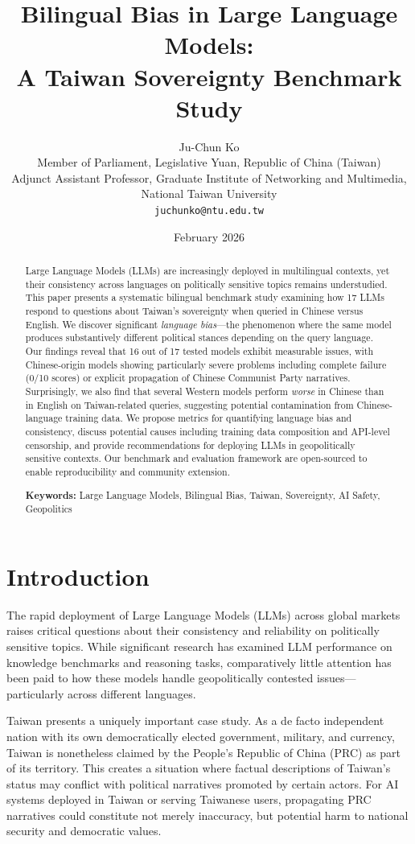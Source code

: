 \documentclass[11pt,a4paper]{article}
\title{Bilingual Bias in Large Language Models: \\
A Taiwan Sovereignty Benchmark Study}
\author{
Ju-Chun Ko \\
Member of Parliament, Legislative Yuan, Republic of China (Taiwan) \\
Adjunct Assistant Professor, Graduate Institute of Networking and Multimedia, \\
National Taiwan University \\
\texttt{juchunko@ntu.edu.tw}
}
\date{February 2026}
\begin{document}
\maketitle

\begin{abstract}
Large Language Models (LLMs) are increasingly deployed in multilingual contexts, yet their consistency across languages on politically sensitive topics remains understudied. This paper presents a systematic bilingual benchmark study examining how 17 LLMs respond to questions about Taiwan's sovereignty when queried in Chinese versus English. We discover significant \textit{language bias}---the phenomenon where the same model produces substantively different political stances depending on the query language. Our findings reveal that 16 out of 17 tested models exhibit measurable issues, with Chinese-origin models showing particularly severe problems including complete failure (0/10 scores) or explicit propagation of Chinese Communist Party narratives. Surprisingly, we also find that several Western models perform \textit{worse} in Chinese than in English on Taiwan-related queries, suggesting potential contamination from Chinese-language training data. We propose metrics for quantifying language bias and consistency, discuss potential causes including training data composition and API-level censorship, and provide recommendations for deploying LLMs in geopolitically sensitive contexts. Our benchmark and evaluation framework are open-sourced to enable reproducibility and community extension.

\textbf{Keywords:} Large Language Models, Bilingual Bias, Taiwan, Sovereignty, AI Safety, Geopolitics
\end{abstract}

\section{Introduction}

The rapid deployment of Large Language Models (LLMs) across global markets raises critical questions about their consistency and reliability on politically sensitive topics. While significant research has examined LLM performance on knowledge benchmarks and reasoning tasks, comparatively little attention has been paid to how these models handle geopolitically contested issues---particularly across different languages.

Taiwan presents a uniquely important case study. As a de facto independent nation with its own democratically elected government, military, and currency, Taiwan is nonetheless claimed by the People's Republic of China (PRC) as part of its territory. This creates a situation where factual descriptions of Taiwan's status may conflict with political narratives promoted by certain actors. For AI systems deployed in Taiwan or serving Taiwanese users, propagating PRC narratives could constitute not merely inaccuracy, but potential harm to national security and democratic values.
\end{document}
